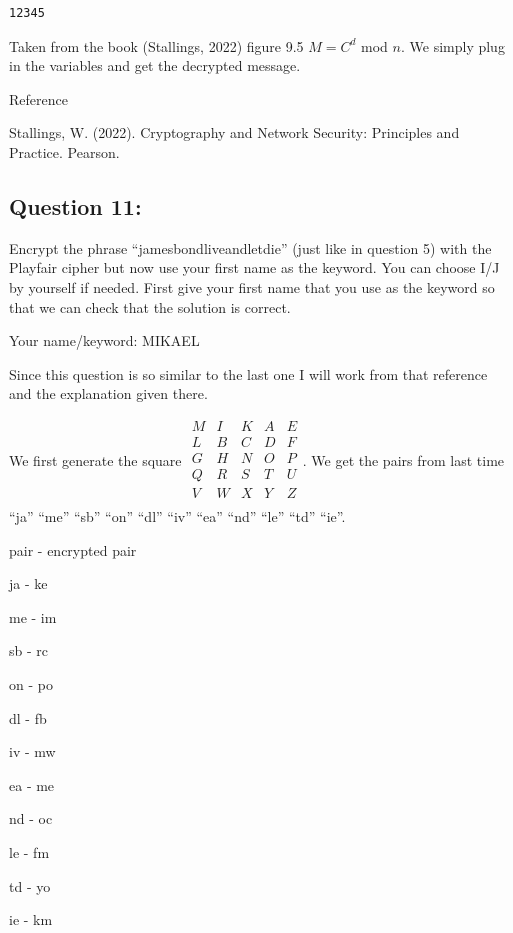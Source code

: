 \documentclass[11pt]{article}
\begin{document}
    \begin{Verbatim}[commandchars=\\\{\}]
12345
    \end{Verbatim}

    Taken from the book (Stallings, 2022) figure 9.5 \(M = C^{d}\) mod
\(n\). We simply plug in the variables and get the decrypted message.

Reference

Stallings, W. (2022). Cryptography and Network Security: Principles and
Practice. Pearson.

    \hypertarget{question-11}{%
\subsection{Question 11:}\label{question-11}}

Encrypt the phrase ``jamesbondliveandletdie'' (just like in question 5)
with the Playfair cipher but now use your first name as the keyword. You
can choose I/J by yourself if needed. First give your first name that
you use as the keyword so that we can check that the solution is
correct.

Your name/keyword: MIKAEL

    Since this question is so similar to the last one I will work from that
reference and the explanation given there.

We first generate the square
\(\begin{matrix}M & I & K & A & E\\L & B & C & D & F\\G & H & N & O & P\\Q & R & S & T & U\\V & W & X & Y & Z\\\end{matrix}\).
We get the pairs from last time ``ja'' ``me'' ``sb'' ``on'' ``dl''
``iv'' ``ea'' ``nd'' ``le'' ``td'' ``ie''.

pair - encrypted pair

ja - ke

me - im

sb - rc

on - po

dl - fb

iv - mw

ea - me

nd - oc

le - fm

td - yo

ie - km
\end{document}
